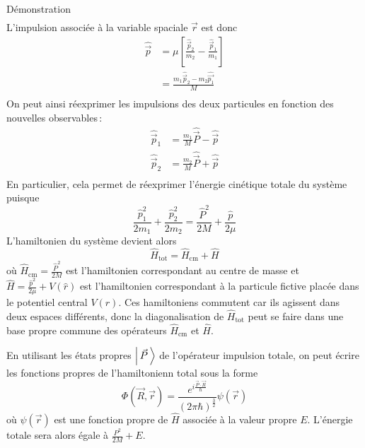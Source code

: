 \begin{demo}{Démonstration}
\begin{align*}
        \end{align*}
        L’impulsion associée à la variable spaciale $\vec{r}$ est donc
        \begin{align*}
            \hat{\vec{p}} 
            &= \mu \left[\frac{\hat{\vec{p}}_2}{m_2} - \frac{\hat{\vec{p}}_1}{m_1}\right] \\
            &= \frac{m_1 \hat{\vec{p}}_2 - m_2 \hat{\vec{p_1}}}{M} \\
        \end{align*}
        On peut ainsi réexprimer les impulsions des deux particules en fonction des nouvelles observables :
        \begin{align*}
            \hat{\vec{p}}_1 &= \frac{m_1}{M} \hat{\vec{P}} - \hat{\vec{p}} \\
            \hat{\vec{p}}_2 &= \frac{m_2}{M} \hat{\vec{P}} + \hat{\vec{p}} \\
        \end{align*}
        En particulier, cela permet de réexprimer l’énergie cinétique totale du système puisque 
        \[ \frac{\hat{p}_1^2}{2m_1} + \frac{\hat{p}_2^2}{2 m_2} = \frac{\hat{P}^2}{2M} + \frac{\hat{p}}{2 \mu} \]
        L’hamiltonien du système devient alors 
        \[ \hat{H}_{\text{tot}} = \hat{H}_{\text{cm}} + \hat{H} \]   
        où $\hat{H}_{\text{cm}} = \frac{\hat{P}^2}{2M}$ est l’hamiltonien correspondant au centre de masse et $\hat{H} = \frac{\hat{p}^2}{2\mu} + V(\hat{r})$ est l’hamiltonien correspondant à la particule fictive placée dans le potentiel central $V(r)$. Ces hamiltoniens commutent car ils agissent dans deux espaces différents, donc la diagonalisation de $\hat{H}_{\text{tot}}$ peut se faire dans une base propre commune des opérateurs $\hat{H}_{\text{cm}}$ et $\hat{H}$. 

        En utilisant les états propres $\left| \, \vec{P} \, \right>$ de l’opérateur impulsion totale, on peut écrire les fonctions propres de l’hamiltonienn total sous la forme 
        \[ \Phi(\vec{R}, \vec{r}) = \frac{e^{i \frac{\vec{P} \cdot \vec{R}}{\hbar}}}{(2\pi \hbar)^{\frac{3}{2}}} \psi(\vec{r}) \]   
        où $\psi(\vec{r})$ est une fonction propre de $\hat{H}$ associée à la valeur propre $E$. L’énergie totale sera alors égale à $\frac{P^2}{2M} + E$. 
    \end{demo}

